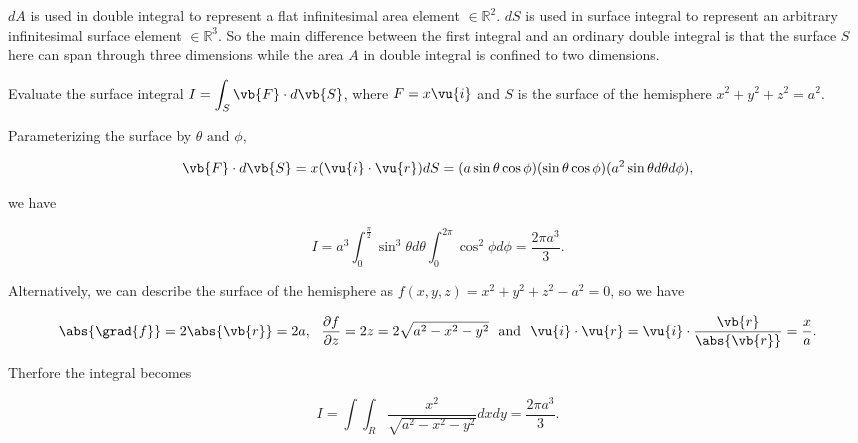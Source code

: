 \documentclass[english,a4paper,12pt]{report}
\begin{document}
\(dA\) is used in double integral to represent a flat infinitesimal area element \(\in \mathbb{R}^2\). \(dS\) is used in surface integral to represent an arbitrary infinitesimal surface element \(\in \mathbb{R}^3 \). So the main difference between the first integral and an ordinary double integral is that the surface \(S\) here can span through three dimensions while the area \(A\) in double integral is confined to two dimensions.


{Evaluate the surface integral \(\displaystyle I = \int_{S}^{} \vb{F} \cdot d\vb{S} \), where \(F = x \vu{i}  \) and \(S\) is the surface of the hemisphere \(x^2 + y^2 + z^2 = a^2\).}
{Parameterizing the surface by \(\theta \text { and } \phi \), 

\begin{equation}
	\vb{F} \cdot d\vb{S}  = x(\vu{i} \cdot \vu{r} )dS = (a \sin \theta \cos \phi )(\sin \theta \cos \phi )(a^2\sin \theta d \theta d\phi ),
\end{equation}

we have 

\begin{equation}
	I = a^3 \int_{0}^{\frac{\pi }{2} } \sin ^3 \theta d \theta \int_{0}^{2\pi } \cos ^2\phi d\phi = \frac{2\pi a^3 }{3}.    
\end{equation}

Alternatively, we can describe the surface of the hemisphere as \(f(x,y,z) = x^2 + y^2 + z^2 - a^2 = 0\), so we have 

\begin{equation}
	\abs{\grad{f} } = 2\abs{\vb{r} } = 2a, ~~ 	\frac{\partial f}{\partial z} = 2z = 2\sqrt{a^2-x^2-y^2} ~\text { and }~ \vu{i} \cdot \vu{r} = \vu{i} \cdot \frac{\vb{r} }{\abs{\vb{r} } } = \frac{x}{a}. 
\end{equation}

Therfore the integral becomes

\begin{equation}
	I = \int \int_{R}^{} \frac{x^2}{\sqrt{a^2-x^2-y^2} }dxdy = \frac{2\pi a^3 }{3}.    
\end{equation}
 } 
 
\end{document}
